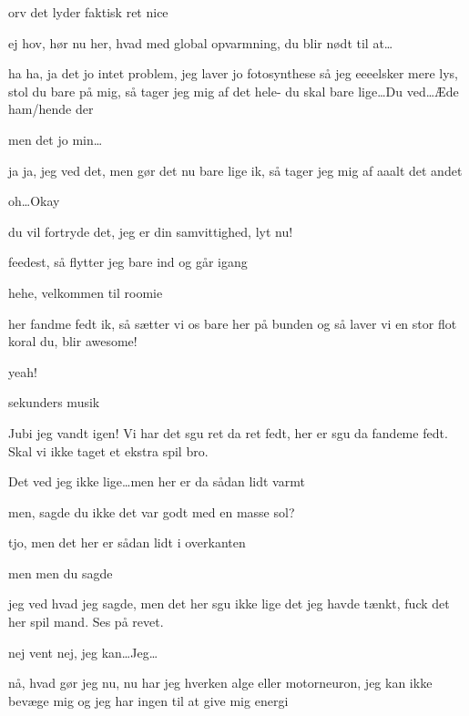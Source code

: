 \documentclass[a4paper,11pt]{article}
\begin{document}
\begin{sketch}
 orv det lyder faktisk ret nice

 ej hov, hør nu her, hvad med global opvarmning, du blir nødt til at\ldots

 ha ha, ja det jo intet problem, jeg laver jo fotosynthese så jeg eeeelsker mere lys,  stol du bare på mig, så tager jeg mig af det hele- du skal bare lige\ldots Du ved\ldots Æde ham/hende der        

 men det jo min\ldots

 ja ja, jeg ved det, men gør det nu bare lige ik, så tager jeg mig af aaalt det andet 

 oh\ldots Okay

 du vil fortryde det, jeg er din samvittighed, lyt nu!


 feedest, så flytter jeg bare ind og går igang

 hehe, velkommen til roomie

 her fandme fedt ik, så sætter vi os bare her på bunden og så laver vi en stor flot koral du, blir awesome!

 yeah!


  sekunders musik

 Jubi jeg vandt igen! Vi har det sgu ret da ret fedt, her er sgu da fandeme fedt. Skal vi ikke taget et ekstra spil bro.

 Det ved jeg ikke lige\ldots men her er da sådan lidt varmt 

 men, sagde du ikke det var godt med en masse sol?

 tjo, men det her er sådan lidt i overkanten 

 men men du sagde

 jeg ved hvad jeg sagde, men det her sgu ikke lige det jeg havde tænkt, fuck det her spil mand. Ses på revet.


 nej vent nej, jeg kan\ldots Jeg\ldots


 nå, hvad gør jeg nu, nu har jeg hverken alge eller motorneuron, jeg kan ikke bevæge mig og jeg har ingen til at give mig energi


\end{sketch}
\end{document}
